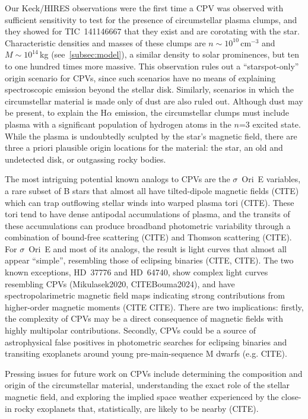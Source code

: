 \documentclass{nature3}
\begin{document}
Our Keck/HIRES observations were the first time a CPV was observed
with sufficient sensitivity to test for the presence of circumstellar
plasma clumps, and they showed for TIC~141146667 that they exist and
are corotating with the star.  
Characteristic densities and masses of these clumps are $n \sim
10^{10}$\,cm$^{-3}$ and $M \sim 10^{14}$\,kg (see~\ref{subsec:model}),
a similar density to solar prominences, but ten to one hundred times
more massive.
This observation rules out a ``starspot-only'' origin scenario
for CPVs, \cite{Koen2021} since such scenarios have no means of
explaining spectroscopic emission beyond the stellar disk.  Similarly,
scenarios in which the circumstellar material is made only of dust are
also ruled out.  Although dust may be present, to explain the
H$\alpha$ emission, the circumstellar clumps must include plasma with
a significant population of hydrogen atoms in the $n$=3 excited state.
While the plasma is undoubtedly sculpted by the star's magnetic field,
there are three a priori plausible origin locations for the material:
the star, an old and undetected disk, or outgassing rocky bodies.

The most intriguing potential known analogs to CPVs 
are the $\sigma$~Ori~E variables, a rare subset of B stars that almost
all have tilted-dipole magnetic fields (CITE) which can trap outflowing
stellar winds into warped plasma tori (CITE). 
These tori tend to have dense antipodal accumulations of plasma, and
the transits of these accumulations can produce broadband photometric
variability through a combination of bound-free scattering (CITE) and
Thomson scattering (CITE).  For $\sigma$~Ori~E
and most of its analogs, the result is light curves that almost all
appear ``simple'', resembling those of eclipsing binaries (CITE,
CITE).  The two known exceptions, HD~37776 and HD~64740, show complex
light curves resembling CPVs (Mikulasek2020, CITEBouma2024), and have
spectropolarimetric magnetic field maps indicating strong
contributions from higher-order magnetic moments (CITE CITE).  There are two
implications: firstly, the complexity of CPVs may be a direct
consequence of magnetic fields with highly multipolar contributions.
Secondly, CPVs could be a source of astrophysical false positives in
photometric searches for eclipsing binaries and transiting exoplanets
around young pre-main-sequence M dwarfs (e.g.  CITE).

Pressing issues for future work on CPVs include determining the
composition and origin of the circumstellar material, understanding
the exact role of the stellar magnetic field, and exploring the
implied space weather experienced by the close-in rocky exoplanets
that, statistically, are likely to be nearby (CITE).
\end{document}
